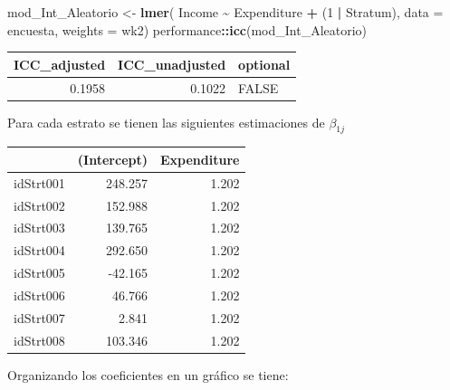 \documentclass[
  12pt,
]{book}
\newenvironment{Shaded}{\begin{snugshade}}{\end{snugshade}}
\newcommand{\AttributeTok}[1]{\textcolor[rgb]{0.13,0.29,0.53}{#1}}
\newcommand{\DataTypeTok}[1]{\textcolor[rgb]{0.13,0.29,0.53}{#1}}
\newcommand{\DecValTok}[1]{\textcolor[rgb]{0.00,0.00,0.81}{#1}}
\newcommand{\FunctionTok}[1]{\textcolor[rgb]{0.13,0.29,0.53}{\textbf{#1}}}
\newcommand{\NormalTok}[1]{#1}
\newcommand{\OtherTok}[1]{\textcolor[rgb]{0.56,0.35,0.01}{#1}}
\newcommand{\SpecialCharTok}[1]{\textcolor[rgb]{0.81,0.36,0.00}{\textbf{#1}}}
\begin{document}
\begin{Shaded}
\begin{Highlighting}[]
\NormalTok{mod\_Int\_Aleatorio }\OtherTok{\textless{}{-}} \FunctionTok{lmer}\NormalTok{( Income }\SpecialCharTok{\textasciitilde{}}\NormalTok{ Expenditure  }\SpecialCharTok{+}\NormalTok{ (}\DecValTok{1} \SpecialCharTok{|}\NormalTok{ Stratum),}
  \AttributeTok{data =}\NormalTok{ encuesta, }\AttributeTok{weights  =}\NormalTok{  wk2)}
\NormalTok{performance}\SpecialCharTok{::}\FunctionTok{icc}\NormalTok{(mod\_Int\_Aleatorio)}
\end{Highlighting}
\end{Shaded}

\begin{tabular}{r|r|l}
\hline
ICC\_adjusted & ICC\_unadjusted & optional\\
\hline
0.1958 & 0.1022 & FALSE\\
\hline
\end{tabular}

Para cada estrato se tienen las siguientes estimaciones de \(\beta_{1j}\)

\begin{Shaded}
\end{Shaded}

\begin{tabular}{l|r|r}
\hline
  & (Intercept) & Expenditure\\
\hline
idStrt001 & 248.257 & 1.202\\
\hline
idStrt002 & 152.988 & 1.202\\
\hline
idStrt003 & 139.765 & 1.202\\
\hline
idStrt004 & 292.650 & 1.202\\
\hline
idStrt005 & -42.165 & 1.202\\
\hline
idStrt006 & 46.766 & 1.202\\
\hline
idStrt007 & 2.841 & 1.202\\
\hline
idStrt008 & 103.346 & 1.202\\
\hline
\end{tabular}

Organizando los coeficientes en un gráfico se tiene:
\end{document}
